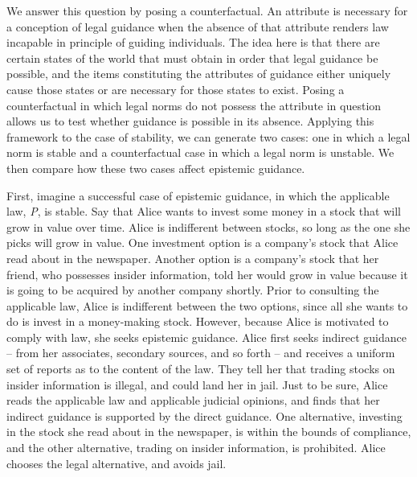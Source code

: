 We answer this question by posing a counterfactual. An attribute is
necessary for a conception of legal guidance when the absence of that
attribute renders law incapable in principle of guiding individuals. The
idea here is that there are certain states of the world that must obtain
in order that legal guidance be possible, and the items constituting the
attributes of guidance either uniquely cause those states or are
necessary for those states to exist. Posing a counterfactual in which
legal norms do not possess the attribute in question allows us to test
whether guidance is possible in its absence. Applying this framework to
the case of stability, we can generate two cases: one in which a legal
norm is stable and a counterfactual case in which a legal norm is
unstable. We then compare how these two cases affect epistemic guidance.

First, imagine a successful case of epistemic guidance, in which the
applicable law, \emph{P}, is stable. Say that Alice wants to invest some
money in a stock that will grow in value over time. Alice is indifferent
between stocks, so long as the one she picks will grow in value. One
investment option is a company's stock that Alice read about in the
newspaper. Another option is a company's stock that her friend, who
possesses insider information, told her would grow in value because it
is going to be acquired by another company shortly. Prior to consulting
the applicable law, Alice is indifferent between the two options, since
all she wants to do is invest in a money-making stock. However, because
Alice is motivated to comply with law, she seeks epistemic guidance.
Alice first seeks indirect guidance -- from her associates, secondary
sources, and so forth -- and receives a uniform set of reports as to the
content of the law. They tell her that trading stocks on insider
information is illegal, and could land her in jail. Just to be sure,
Alice reads the applicable law and applicable judicial opinions, and
finds that her indirect guidance is supported by the direct guidance.
One alternative, investing in the stock she read about in the newspaper,
is within the bounds of compliance, and the other alternative, trading
on insider information, is prohibited. Alice chooses the legal
alternative, and avoids jail.

